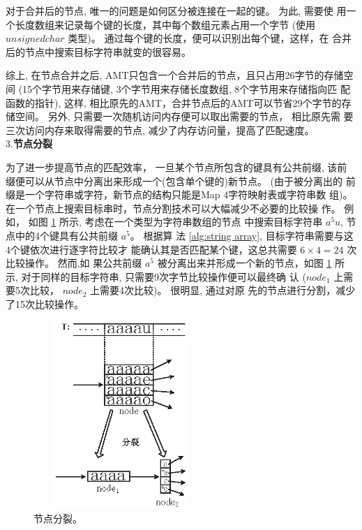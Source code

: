 对于合并后的节点, 唯一的问题是如何区分被连接在一起的键。 为此, 需要使
用一个长度数组来记录每个键的长度，其中每个数组元素占用一个字节 (使用
$unsigned char$ 类型)。 通过每个键的长度，便可以识别出每个键，这样，在
合并后的节点中搜索目标字符串就变的很容易。

综上, 在节点合并之后, AMT只包含一个合并后的节点，且只占用26字节的存储空
间 (15个字节用来存储键, 3个字节用来存储长度数组, 8个字节用来存储指向匹
配函数的指针), 这样, 相比原先的AMT，合并节点后的AMT可以节省29个字节的存
储空间。 另外, 只需要一次随机访问内存便可以取出需要的节点， 相比原先需
要三次访问内存来取得需要的节点, 减少了内存访问量，提高了匹配速度。\\

3.\textbf{节点分裂}

为了进一步提高节点的匹配效率， 一旦某个节点所包含的键具有公共前缀, 该前
缀便可以从节点中分离出来形成一个(包含单个键的)新节点。 (由于被分离出的
前缀是一个字符串或字符，新节点的结构只能是Map 4字符映射表或字符串数
组)。 在一个节点上搜索目标串时，节点分割技术可以大幅减少不必要的比较操
作。 例如， 如图 \ref{fig:split} 所示, 考虑在一个类型为字符串数组的节点
中搜索目标字符串 $a^5u$, 节点中的4个键具有公共前缀 $a^5$。 根据算
法 \ref{alg:string array}, 目标字符串需要与这4个键依次进行逐字符比较才
能确认其是否匹配某个键，这总共需要 $6 \times 4 = 24$ 次比较操作。 然而,如
果公共前缀 $a^5$ 被分离出来并形成一个新的节点，如图 \ref{fig:split} 所
示, 对于同样的目标字符串, 只需要9次字节比较操作便可以最终确
认 ($node_1$ 上需要5次比较， $node_2$ 上需要4次比较)。 很明显, 通过对原
先的节点进行分割，减少了15次比较操作。

\begin{figure}[H]
  \centering
  \includegraphics[height=2.8in, width=2.6in]{figures/2_MPM/node_split}
  \caption{节点分裂。}
  \label{fig:split}
\end{figure}

